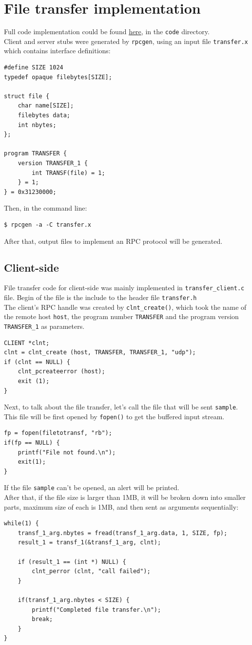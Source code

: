 \documentclass[times, 10pt]{thesisMDH}
\begin{document}
\section{File transfer implementation}
Full code implementation could be found \href{https://github.com/npthao1312/ds2021/tree/master/labwork2/code}{here}, in the \texttt{code} directory.\\[0.5em]
Client and server stubs were generated by \texttt{rpcgen}, using an input file \texttt{transfer.x} which contains interface definitions:
\begin{lstlisting}
#define SIZE 1024
typedef opaque filebytes[SIZE];

struct file {
	char name[SIZE];
	filebytes data;
	int nbytes;
};

program TRANSFER {
	version TRANSFER_1 {
		int TRANSF(file) = 1;
	} = 1;
} = 0x31230000;
\end{lstlisting}
Then, in the command line:
\begin{lstlisting}
$ rpcgen -a -C transfer.x
\end{lstlisting}
After that, output files to implement an RPC protocol will be generated.

\subsection{Client-side}
File transfer code for client-side was mainly implemented in \texttt{transfer\_client.c} file. Begin of the file is the include to the header file \texttt{transfer.h}\\[0.5em]
The client's RPC handle was created by \texttt{clnt\_create()}, which took the name of the remote host \texttt{host}, the program number \texttt{TRANSFER} and the program version \texttt{TRANSFER\_1} as parameters.
\begin{lstlisting}
CLIENT *clnt;
clnt = clnt_create (host, TRANSFER, TRANSFER_1, "udp");
if (clnt == NULL) {
	clnt_pcreateerror (host);
	exit (1);
}
\end{lstlisting}
Next, to talk about the file transfer, let's call the file that will be sent \texttt{sample}. This file will be first opened by \texttt{fopen()} to get the buffered input stream.
\begin{lstlisting}
fp = fopen(filetotransf, "rb");
if(fp == NULL) {
	printf("File not found.\n");
	exit(1);
}
\end{lstlisting}
If the file \texttt{sample} can't be opened, an alert will be printed.\\[0.5em]
After that, if the file size is larger than 1MB, it will be broken down into smaller parts, maximum size of each is 1MB, and then sent as arguments sequentially:
\begin{lstlisting}
while(1) {
	transf_1_arg.nbytes = fread(transf_1_arg.data, 1, SIZE, fp);
	result_1 = transf_1(&transf_1_arg, clnt);
	
	if (result_1 == (int *) NULL) {
		clnt_perror (clnt, "call failed");
	}

	if(transf_1_arg.nbytes < SIZE) {
		printf("Completed file transfer.\n");
		break;
	}
}
\end{lstlisting}
\end{document}
